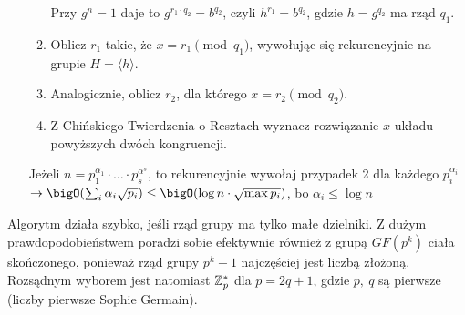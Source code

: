 \begin{greyframe}
\begin{enumerate}[I]
\begin{enumerate}
\[            \]
            Przy \( g^n = 1 \) daje to \( g^{r_1 \cdot q_2} = b^{q_2} \), czyli \( h^{r_1} = b^{q_2} \), gdzie \( h = g^{q_2} \) ma rząd \( q_1 \).
            \item Oblicz \( r_1 \) takie, że \( x = r_1 \pmod{q_1} \), wywołując się rekurencyjnie na grupie \( H = \langle h \rangle \).
            \item Analogicznie, oblicz \( r_2 \), dla którego \( x = r_2 \pmod{q_2} \).
            \item Z Chińskiego Twierdzenia o Resztach wyznacz rozwiązanie \( x \) układu powyższych dwóch kongruencji.
        \end{enumerate}
        Jeżeli \( n = p_1^{\alpha_1} \cdot \ldots \cdot p_s^{\alpha^s} \), to rekurencyjnie wywołaj przypadek 2 dla każdego \( p_i^{\alpha_i} \) \( \rightarrow \bigO(\sum_i \alpha_i \sqrt{p_i}) \leq \bigO(\log n \cdot \sqrt{\max{p_i}}) \), bo \( \alpha_i \leq \log n \)
    \end{enumerate}
\end{greyframe}

Algorytm działa szybko, jeśli rząd grupy ma tylko małe dzielniki. Z dużym prawdopodobieństwem poradzi sobie efektywnie również z grupą \( GF(p^k) \) ciała skończonego, ponieważ rząd grupy \( p^k - 1 \) najczęściej jest liczbą złożoną.
Rozsądnym wyborem jest natomiast \( \mathbb{Z}^{*}_p \) dla \( p = 2q + 1 \), gdzie \( p, \ q \) są pierwsze (liczby pierwsze Sophie Germain).